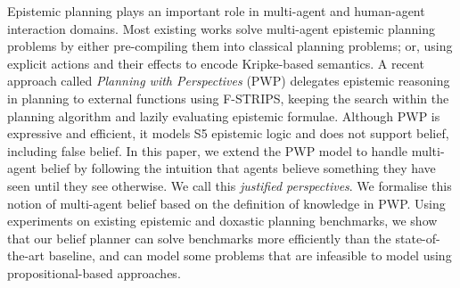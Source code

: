 Epistemic planning plays an important role in multi-agent and human-agent interaction domains. 
Most existing works solve multi-agent epistemic planning problems by either pre-compiling them into classical planning problems; or, using explicit actions and their effects to encode Kripke-based semantics. 
A recent approach called \emph{Planning with Perspectives} (PWP) delegates epistemic reasoning in planning to external functions using F-STRIPS, keeping the search within the planning algorithm and lazily evaluating epistemic formulae.
Although PWP is expressive and efficient, it models S5 epistemic logic and does not support belief, including false belief. 
In this paper, we extend the PWP model to handle multi-agent belief by following the intuition that agents believe something they have seen until they see otherwise. We call this \emph{justified perspectives}. We formalise this notion of multi-agent belief based on the definition of knowledge in PWP. Using experiments on existing epistemic and doxastic planning benchmarks, we show that our belief planner can solve benchmarks more efficiently than the state-of-the-art baseline, and can model some problems that are infeasible to model using propositional-based approaches.